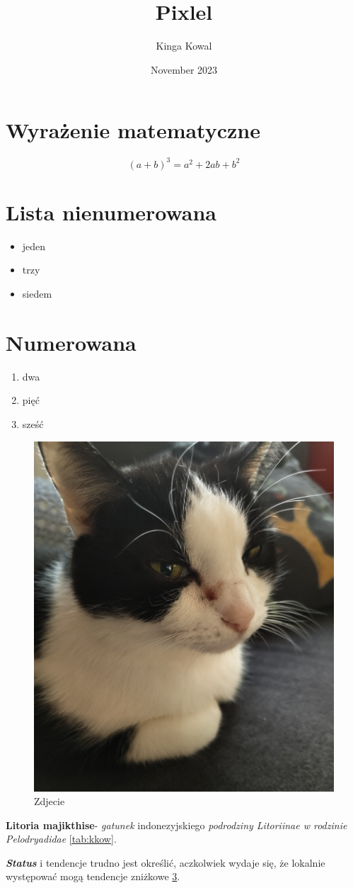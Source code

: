 \documentclass{article}
\title{Pixlel}
\author{Kinga Kowal}
\date{November 2023}
\begin{document}
\maketitle

\section{Wyrażenie matematyczne}
\[ (a+b)^3=a^2+2ab+b^2 \]

\section{Lista nienumerowana}
\begin{itemize}
  \item jeden
  \item trzy
  \item siedem
\end{itemize}

\section{Numerowana}
\label{sec:lista}
\begin{enumerate}
  \item dwa
  \item pięć
  \item sześć
\end{enumerate}



\begin{figure}
    \centering
    \centerline{\includegraphics[scale=0.15]{pictures/kow.jpg}}
    \caption[width=0.4\textwidth]{Zdjecie}
    \label{Zdjecie kota}
\end{figure}


 

\textbf{Litoria majikthise}- \emph{gatunek} indonezyjskiego \emph{podrodziny Litoriinae w rodzinie Pelodryadidae} \ref{tab:kkow}. 

\textbf{\emph{Status}} i tendencje trudno jest określić, aczkolwiek wydaje się, że lokalnie występować mogą tendencje zniżkowe \ref{sec:lista}.
\end{document}
